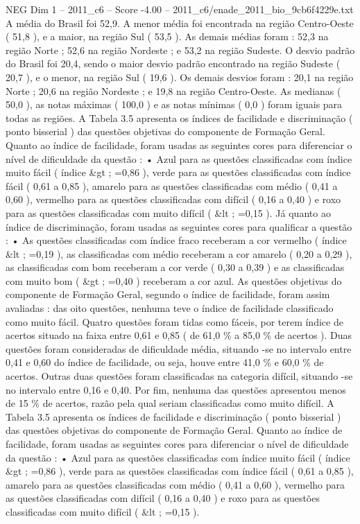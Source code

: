 \begin{textsample}{NEG Dim 1 – 2011\_c6 – Score -4.00 – 2011\_c6/enade\_2011\_bio\_9cb6f4229e.txt}
A média do Brasil foi 52,9.
A menor média foi encontrada na região Centro-Oeste ( 51,8 ), e a maior, na região Sul ( 53,5 ).
As demais médias foram : 52,3 na região Norte ; 52,6 na região Nordeste ; e 53,2 na região Sudeste.
O desvio padrão do Brasil foi 20,4, sendo o maior desvio padrão encontrado na região Sudeste ( 20,7 ), e o menor, na região Sul ( 19,6 ).
Os demais desvios foram : 20,1 na região Norte ; 20,6 na região Nordeste ; e 19,8 na região Centro-Oeste.
As medianas ( 50,0 ), as notas máximas ( 100,0 ) e as notas mínimas ( 0,0 ) foram iguais para todas as regiões.
A Tabela 3.5 apresenta os índices de facilidade e discriminação ( ponto bisserial ) das questões objetivas do componente de Formação Geral.
Quanto ao índice de facilidade, foram usadas as seguintes cores para diferenciar o nível de dificuldade da questão : • Azul para as questões classificadas com índice muito fácil ( índice \&gt ; =0,86 ), verde para as questões classificadas com índice fácil ( 0,61 a 0,85 ), amarelo para as questões classificadas com médio ( 0,41 a 0,60 ), vermelho para as questões classificadas com difícil ( 0,16 a 0,40 ) e roxo para as questões classificadas com muito difícil ( \&lt ; =0,15 ).
Já quanto ao índice de discriminação, foram usadas as seguintes cores para qualificar a questão : • As questões classificadas com índice fraco receberam a cor vermelho ( índice \&lt ; =0,19 ), as classificadas com médio receberam a cor amarelo ( 0,20 a 0,29 ), as classificadas com bom receberam a cor verde ( 0,30 a 0,39 ) e as classificadas com muito bom ( \&gt ; =0,40 ) receberam a cor azul.
As questões objetivas do componente de Formação Geral, segundo o índice de facilidade, foram assim avaliadas : das oito questões, nenhuma teve o índice de facilidade classificado como muito fácil.
Quatro questões foram tidas como fáceis, por terem índice de acertos situado na faixa entre 0,61 e 0,85 ( de 61,0 \% a 85,0 \% de acertos ).
Duas questões foram consideradas de dificuldade média, situando -se no intervalo entre 0,41 e 0,60 do índice de facilidade, ou seja, houve entre 41,0 \% e 60,0 \% de acertos.
Outras duas questões foram classificadas na categoria difícil, situando -se no intervalo entre 0,16 e 0,40.
Por fim, nenhuma das questões apresentou menos de 15 \% de acertos, razão pela qual seriam classificadas como muito difícil.
A Tabela 3.5 apresenta os índices de facilidade e discriminação ( ponto bisserial ) das questões objetivas do componente de Formação Geral.
Quanto ao índice de facilidade, foram usadas as seguintes cores para diferenciar o nível de dificuldade da questão : • Azul para as questões classificadas com índice muito fácil ( índice \&gt ; =0,86 ), verde para as questões classificadas com índice fácil ( 0,61 a 0,85 ), amarelo para as questões classificadas com médio ( 0,41 a 0,60 ), vermelho para as questões classificadas com difícil ( 0,16 a 0,40 ) e roxo para as questões classificadas com muito difícil ( \&lt ; =0,15 ).

\end{textsample}
